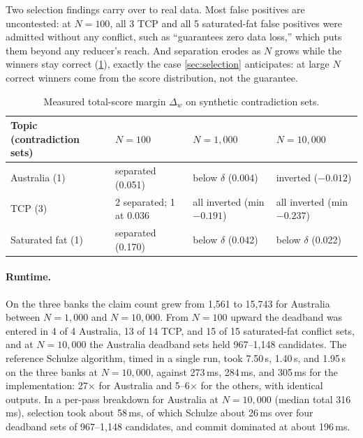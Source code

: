 Two selection findings carry over to real data. Most false positives are uncontested: at $N = 100$, all 3 TCP and all 5 saturated-fat false positives were admitted without any conflict, such as ``guarantees zero data loss,'' which puts them beyond any reducer's reach. And separation erodes as $N$ grows while the winners stay correct (\cref{tab:margins-synth}), exactly the case \cref{sec:selection} anticipates: at large $N$ correct winners come from the score distribution, not the guarantee.

\begin{table}[t]
  \centering
  \caption{Measured total-score margin $\Delta_w$ on synthetic contradiction sets.}
  \label{tab:margins-synth}
  \small
  \setlength{\tabcolsep}{3pt}
  \begin{tabular}{@{}llll@{}}
    \toprule
    Topic (contradiction sets) & $N = 100$ & $N = 1{,}000$ & $N = 10{,}000$ \\
    \midrule
    Australia (1) & separated (0.051) & below $\delta$ (0.004) & inverted ($-0.012$) \\
    TCP (3) & 2 separated; 1 at 0.036 & all inverted (min $-0.191$) & all inverted (min $-0.237$) \\
    Saturated fat (1) & separated (0.170) & below $\delta$ (0.042) & below $\delta$ (0.022) \\
    \bottomrule
  \end{tabular}
\end{table}



\paragraph{Runtime.} On the three banks the claim count grew from 1,561 to 15,743 for Australia between $N = 1{,}000$ and $N = 10{,}000$. From $N = 100$ upward the deadband was entered in 4 of 4 Australia, 13 of 14 TCP, and 15 of 15 saturated-fat conflict sets, and at $N = 10{,}000$ the Australia deadband sets held 967--1,148 candidates. The reference Schulze algorithm, timed in a single run, took 7.50\,s, 1.40\,s, and 1.95\,s on the three banks at $N = 10{,}000$, against 273\,ms, 284\,ms, and 305\,ms for the implementation: 27$\times$ for Australia and 5--6$\times$ for the others, with identical outputs. In a per-pass breakdown for Australia at $N = 10{,}000$ (median total 316\,ms), selection took about 58\,ms, of which Schulze about 26\,ms over four deadband sets of 967--1,148 candidates, and commit dominated at about 196\,ms.

